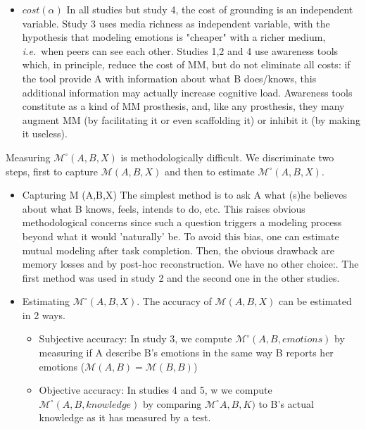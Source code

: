 \documentclass{report}
\newcommand{\ie}{{\textit{i.e.\ }}}
\newcommand{\model}[3]{{$\mathcal{M}(#1, #2, #3)$}}
\newcommand{\Model}[3]{{$\mathcal{M}^{\circ}(#1, #2, #3)$}}
\begin{document}
\begin{itemize}
    \item $cost(\alpha)$ In all studies but study 4, the cost of  grounding is
        an independent variable. Study 3 uses media richness as independent
        variable, with the hypothesis that modeling emotions is "cheaper" with a
        richer medium, \ie  when peers can see each other.  Studies 1,2 and 4
        use awareness tools which, in principle, reduce the cost of MM, but do
        not eliminate all costs: if the tool provide A with information about
        what B does/knows, this additional information may actually increase
        cognitive load. Awareness tools constitute as a kind of MM prosthesis,
        and, like any prosthesis, they many augment MM (by facilitating it or
        even scaffolding it) or inhibit it (by making it useless).

\end{itemize}


Measuring \Model{A}{B}{X} is methodologically difficult. We
discriminate two steps, first to capture \model{A}{B}{X} and then to
estimate \Model{A}{B}{X}. 

\begin{itemize}
    \item Capturing M (A,B,X) The simplest method is to ask A what (s)he
        believes about what B knows, feels, intends to do, etc. This raises
        obvious methodological concerns since such a question triggers a
        modeling process beyond what it would 'naturally' be. To avoid this
        bias, one can estimate mutual modeling after task completion. Then, the
        obvious drawback are memory losses and by post-hoc reconstruction. We
        have no other choice:. The first method was used in study 2 and the
        second one in the other studies.  

    \item Estimating \Model{A}{B}{X}. The accuracy of
        \model{A}{B}{X} can be
        estimated in 2 ways.
        \begin{itemize}
            \item Subjective accuracy: In study 3, we compute
                \Model{A}{B}{emotions} by measuring if A describe
                B's emotions in the same way B reports her emotions 
                ($\mathcal{M}(A,B)=\mathcal{M}(B,B)$) 
                
            \item Objective accuracy: In studies 4 and 5, w we compute
                \Model{A}{B}{knowledge} by comparing
                $\mathcal{M}^{\circ}A,B,K)$ to B's actual knowledge as it has
                measured by a test. 

        \end{itemize}

\end{itemize}
\end{document}
